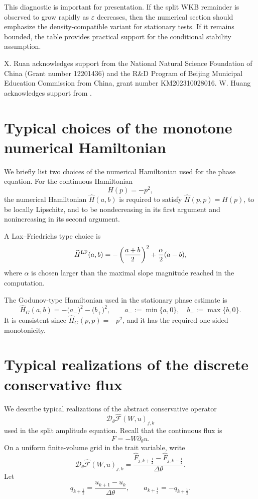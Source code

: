 \documentclass[11pt]{article}
\begin{document}
This diagnostic is important for presentation. If the split WKB remainder is
observed to grow rapidly as \(\varepsilon\) decreases, then the numerical
section should emphasize the density-compatible variant for stationary tests.
If it remains bounded, the table provides practical support for the conditional
stability assumption.



\bigskip
{}
X. Ruan acknowledges support from the National Natural Science Foundation of China (Grant number 12201436) and the R\&D Program of Beijing Municipal Education Commission from China, grant number KM202310028016.
W. Huang acknowledges support from .

\appendix

\section{Typical choices of the monotone numerical Hamiltonian}
\label{append:HJ}

We briefly list two choices of the numerical Hamiltonian used for the phase
equation. For the continuous Hamiltonian
\[
    H(p)=-p^2,
\]
the numerical Hamiltonian \(\widehat H(a,b)\) is required to satisfy
\(\widehat H(p,p)=H(p)\), to be locally Lipschitz, and to be nondecreasing in
its first argument and nonincreasing in its second argument.

A Lax--Friedrichs type choice is
\[
    \widehat H^{\rm LF}(a,b)
    =
    -\left(\frac{a+b}{2}\right)^2
    +
    \frac{\alpha}{2}(a-b),
\]
where \(\alpha\) is chosen larger than the maximal slope magnitude reached in
the computation.

The Godunov-type Hamiltonian used in the stationary phase estimate is
\[
    \widehat H_G(a,b)
    =
    -\bigl(a_-\bigr)^2
    -\bigl(b_+\bigr)^2,
    \qquad
    a_-:=\min\{a,0\},
    \quad
    b_+:=\max\{b,0\}.
\]
It is consistent since \(\widehat H_G(p,p)=-p^2\), and it has the required
one-sided monotonicity.

\section{Typical realizations of the discrete conservative flux}
\label{append:flux}

We describe typical realizations of the abstract conservative operator
\[
    \mathcal D_\theta\widehat{\mathcal F}(W,u)_{j,k}
\]
used in the split amplitude equation. Recall that the continuous flux is
\[
    F=-W\partial_\theta u .
\]
On a uniform finite-volume grid in the trait variable, write
\[
    \mathcal D_\theta\widehat{\mathcal F}(W,u)_{j,k}
    =
    \frac{
    \widehat F_{j,k+\frac12}
    -
    \widehat F_{j,k-\frac12}
    }{\Delta\theta} .
\]
Let
\[
    q_{k+\frac12}
    =
    \frac{u_{k+1}-u_k}{\Delta\theta},
    \qquad
    a_{k+\frac12}=-q_{k+\frac12} .
\]
\end{document}
